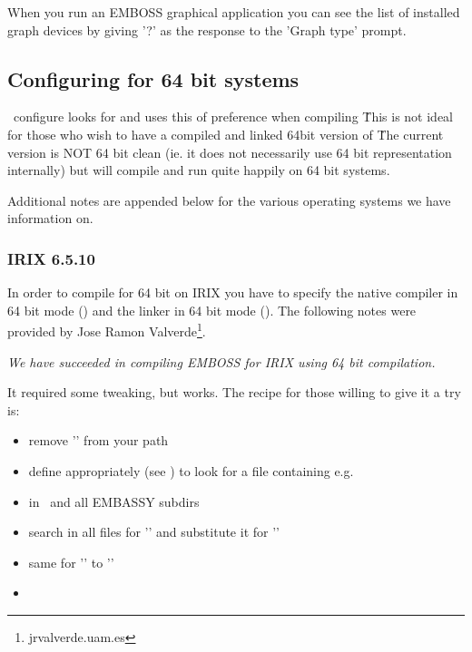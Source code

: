 \documentclass{report}
\begin{document}
When you run an EMBOSS graphical application you can see the list of
installed graph devices by giving '?' as the response to the 'Graph
type' prompt.

\subsection{Configuring for 64 bit systems}

\EMBOSS\ configure looks for  and uses this of
preference when compiling \EMBOSS\. This is not ideal for those who
wish to have a compiled and linked 64bit version of \EMBOSS\. The
current version is NOT 64 bit clean (ie. it does not necessarily use
64 bit representation internally) but will compile and run quite
happily on 64 bit systems.

Additional notes are appended below for the various operating systems
we have information on.

\subsubsection{IRIX 6.5.10}

In order to compile for 64 bit on IRIX you have to specify the native
compiler in 64 bit mode () and the linker in 64 bit
mode (). The following notes were provided by Jose
Ramon Valverde\footnote{jrvalverde\@@cnb.uam.es}.


{\it We have succeeded in compiling EMBOSS for IRIX using 64 bit
compilation.

It required some tweaking, but works. The recipe for those willing to
give it a try is: }

\begin{itemize}
	\item remove '' from your path
	\item define  appropriately
	(see ) to look for a
	 file containing
	e.g. 
	\item {} in \EMBOSS\ and all EMBASSY subdirs
	\item search in all files for '' and
	substitute it for ''
	\item same for '' to ''
	\item {}
\end{itemize}
\end{document}
